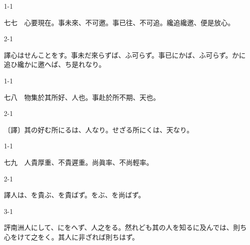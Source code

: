 \documentclass[tate,paper=b6j,jafontsize=9pt]{jlreq}
\begin{document}
\begin{azconvIndented}{1\zw}{-1\zw}

七七　心要現在。事未來、不可邀。事已往、不可追。纔追纔邀、便是放心。

\end{azconvIndented}
\begin{azconvIndented}{2\zw}{-1\zw}

譯心はせんことをす。事未だ來らずば、ふ可らず。事已にかば、ふ可らず。かに追ひ纔かに邀へば、ち是れなり。

\end{azconvIndented}

\begin{azconvIndented}{1\zw}{-1\zw}

七八　物集於其所\azconvKunten{\azconvIR}好、人也。事赴於所\azconvKunten{\azconvIR}不期、天也。

\end{azconvIndented}
\begin{azconvIndented}{2\zw}{-1\zw}

〔譯〕其の好む所にるは、人なり。せざる所にくは、天なり。

\end{azconvIndented}

\begin{azconvIndented}{1\zw}{-1\zw}

七九　人貴厚重、不貴遲重。尚眞率、不尚輕率。

\end{azconvIndented}
\begin{azconvIndented}{2\zw}{-1\zw}

譯人は、を貴ぶ、を貴ばず。をぶ、を尚ばず。

\end{azconvIndented}
\begin{azconvIndented}{3\zw}{-1\zw}

評南洲人にして、にをへず、人之をる。然れども其の人を知るに及んでは、則ち心をけて之をく。其人に非ざれば則ちはず。

\end{azconvIndented}
\end{document}
